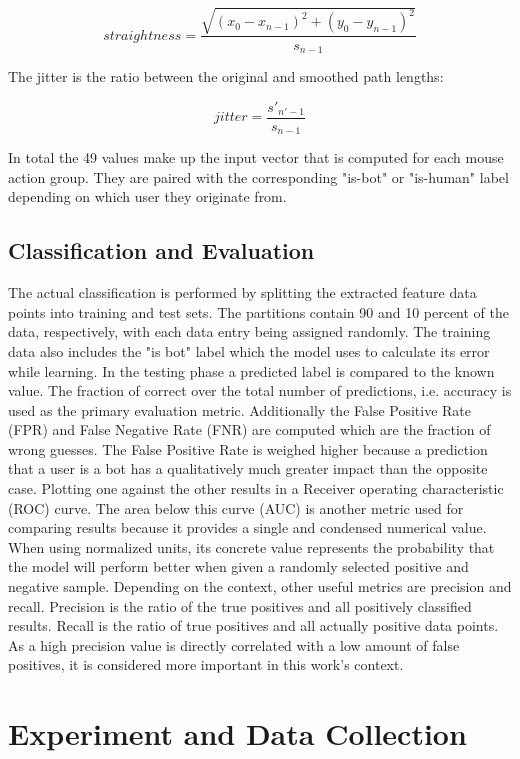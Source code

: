 \documentclass[
    fontsize=12pt,
    headings=small,
    parskip=half,           %
    bibliography=totoc,
    numbers=noenddot,       %
    open=any,               %
    final,                   %
    table
]{scrreprt}
\begin{document}
\[
straightness = \frac{ \sqrt{ (x_0 - x_{n-1})^2 + (y_0 - y_{n-1})^2 } }{s_{n-1}}
\]

The jitter is the ratio between the original and smoothed path lengths:

\[
jitter = \frac{s'_{n'-1}}{s_{n-1}}
\]

In total the 49 values make up the input vector that is computed for each mouse action group. They are paired with the corresponding "is-bot" or "is-human" label depending on which user they originate from.


\subsection{Classification and Evaluation}

The actual classification is performed by splitting the extracted feature data points into training and test sets. The partitions contain 90 and 10 percent of the data, respectively, with each data entry being assigned randomly. The training data also includes the "is bot" label which the model uses to calculate its error while learning. In the testing phase a predicted label is compared to the known value. The fraction of correct over the total number of predictions, i.e. accuracy is used as the primary evaluation metric. Additionally the False Positive Rate (FPR) and False Negative Rate (FNR) are computed which are the fraction of wrong guesses. The False Positive Rate is weighed higher because a prediction that a user is a bot has a qualitatively much greater impact than the opposite case. Plotting one against the other results in a Receiver operating characteristic (ROC) curve. The area below this curve (AUC) is another metric used for comparing results because it provides a single and condensed numerical value. When using normalized units, its concrete value represents the probability that the model will perform better when given a randomly selected positive and negative sample.\cite{FAWCETT2006861} Depending on the context, other useful metrics are precision and recall. Precision is the ratio of the true positives and all positively classified results. Recall is the ratio of true positives and all actually positive data points. As a high precision value is directly correlated with a low amount of false positives, it is considered more important in this work's context.

\section{Experiment and Data Collection}
\end{document}
